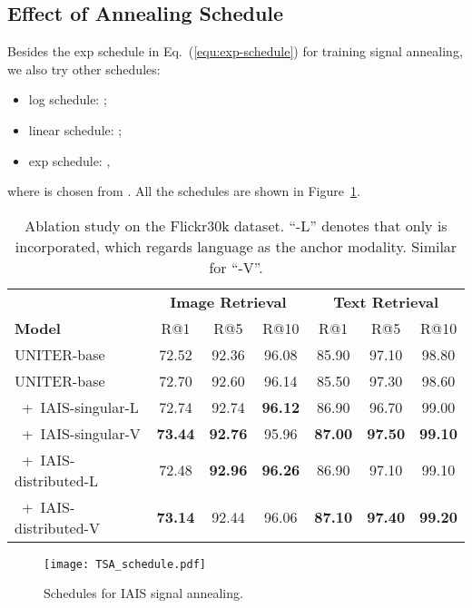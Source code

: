 \documentclass[11pt,a4paper]{article}
\begin{document}
\subsection{Effect of Annealing Schedule}
Besides the exp schedule in Eq.~(\ref{equ:exp-schedule}) for training signal annealing, we also try other schedules: 
\begin{itemize}
    \item log schedule: ;
    \item linear schedule: ;
    \item exp schedule: ,
\end{itemize}
\noindent where  is chosen from .
All the schedules are shown in Figure~\ref{fig:tsa-schedule}. 
\begin{table}[t!]
\begin{adjustbox}{max width=0.48\textwidth}
\begin{tabular}{lcccccc}
\toprule
               & \multicolumn{3}{c}{\textbf{Image Retrieval}} & \multicolumn{3}{c}{\textbf{Text Retrieval}} \\ \cmidrule(lr){2-4} \cmidrule(lr){5-7} 
\textbf{Model} & R@1   & R@5   & R@10                         & R@1           & R@5          & R@10         \\ \midrule
UNITER-base    & 72.52 & 92.36 & 96.08                        & 85.90         & 97.10        & 98.80        \\
UNITER-base    & 72.70 & 92.60 & 96.14 & 85.50         & 97.30        & 98.60        \\ \midrule
~+~IAIS-singular-L    & 72.74 & 92.74 & \textbf{96.12}                        & 86.90         & 96.70        & 99.00        \\
~+~IAIS-singular-V    & \textbf{73.44} & \textbf{92.76} & 95.96                        & \textbf{87.00}  & \textbf{97.50}  & \textbf{99.10}        \\ \midrule
~+~IAIS-distributed-L    & 72.48 & \textbf{92.96} & \textbf{96.26}                        & 86.90         & 97.10        & 99.10        \\
~+~IAIS-distributed-V    & \textbf{73.14} & 92.44 & 96.06                        & \textbf{87.10}  & \textbf{97.40}  & \textbf{99.20}        \\ \bottomrule
\end{tabular}
\end{adjustbox}
\caption{Ablation study on the Flickr30k dataset. ``-L'' denotes that only  is incorporated, which regards language as the anchor modality. Similar for ``-V''.}
\label{tb:ablation-study}
\end{table} \begin{figure}[t!]
    \centering
    \texttt{[image: TSA\_schedule.pdf]}
    \caption{Schedules for IAIS signal annealing.}
    \label{fig:tsa-schedule}
\end{figure}
\end{document}
